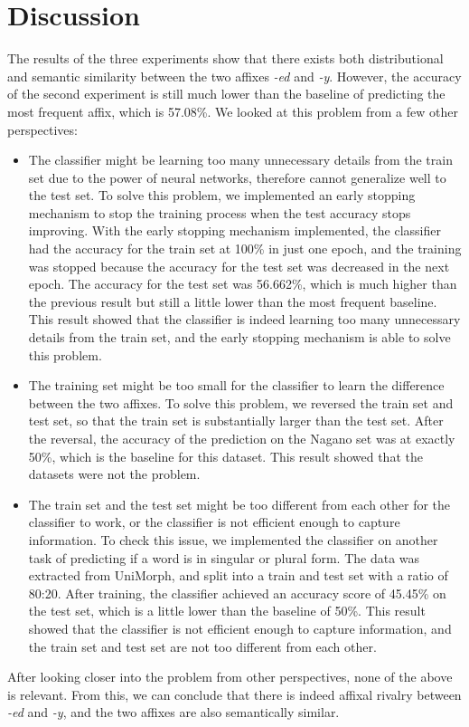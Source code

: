 \documentclass[12pt]{article}
\begin{document}
\section{Discussion}
    The results of the three experiments show that there exists both distributional and semantic similarity between the two affixes \emph{-ed} and \emph{-y}. However, the accuracy of the second experiment is still much lower than the baseline of predicting the most frequent affix, which is 57.08\%. We looked at this problem from a few other perspectives:
    \begin{itemize}
        \item The classifier might be learning too many unnecessary details from the train set due to the power of neural networks, therefore cannot generalize well to the test set. To solve this problem, we implemented an early stopping mechanism to stop the training process when the test accuracy stops improving. With the early stopping mechanism implemented, the classifier had the accuracy for the train set at 100\% in just one epoch, and the training was stopped because the accuracy for the test set was decreased in the next epoch. The accuracy for the test set was 56.662\%, which is much higher than the previous result but still a little lower than the most frequent baseline. This result showed that the classifier is indeed learning too many unnecessary details from the train set, and the early stopping mechanism is able to solve this problem. 
        \item The training set might be too small for the classifier to learn the difference between the two affixes. To solve this problem, we reversed the train set and test set, so that the train set is substantially larger than the test set. After the reversal, the accuracy of the prediction on the Nagano set was at exactly 50\%, which is the baseline for this dataset. This result showed that the datasets were not the problem. 
        \item The train set and the test set might be too different from each other for the classifier to work, or the classifier is not efficient enough to capture information. To check this issue, we implemented the classifier on another task of predicting if a word is in singular or plural form. The data was extracted from UniMorph, and split into a train and test set with a ratio of 80:20. After training, the classifier achieved an accuracy score of 45.45\% on the test set, which is a little lower than the baseline of 50\%. This result showed that the classifier is not efficient enough to capture information, and the train set and test set are not too different from each other.
        
    \end{itemize}
    After looking closer into the problem from other perspectives, none of the above is relevant. From this, we can conclude that there is indeed affixal rivalry between \emph{-ed} and \emph{-y}, and the two affixes are also semantically similar.
\end{document}
